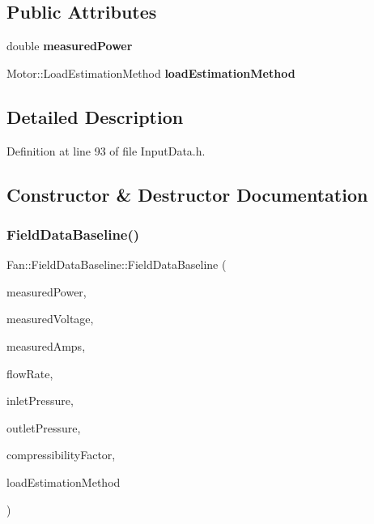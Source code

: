 \subsection*{Public Attributes}
\begin{DoxyCompactItemize}
\item 
\mbox{\label{struct_fan_1_1_field_data_baseline_a72db904713df81b8c4e8edc5555e9061}} 
double {\bfseries measured\+Power}
\item 
\mbox{\label{struct_fan_1_1_field_data_baseline_ad30a17fe79073102a5290a1edd0ac3e9}} 
Motor\+::\+Load\+Estimation\+Method {\bfseries load\+Estimation\+Method}
\end{DoxyCompactItemize}


\subsection{Detailed Description}


Definition at line 93 of file Input\+Data.\+h.



\subsection{Constructor \& Destructor Documentation}
\mbox{\label{struct_fan_1_1_field_data_baseline_a99f4a04d6960b3fe664b991581da87d3}} 
\subsubsection{\texorpdfstring{Field\+Data\+Baseline()}{FieldDataBaseline()}\hspace{0.1cm}{\footnotesize\ttfamily [1/3]}}
{\footnotesize\ttfamily Fan\+::\+Field\+Data\+Baseline\+::\+Field\+Data\+Baseline (\begin{DoxyParamCaption}\item[{const double}]{measured\+Power,  }\item[{const double}]{measured\+Voltage,  }\item[{const double}]{measured\+Amps,  }\item[{const double}]{flow\+Rate,  }\item[{const double}]{inlet\+Pressure,  }\item[{const double}]{outlet\+Pressure,  }\item[{const double}]{compressibility\+Factor,  }\item[{Motor\+::\+Load\+Estimation\+Method}]{load\+Estimation\+Method }\end{DoxyParamCaption})\hspace{0.3cm}{\ttfamily [inline]}}

